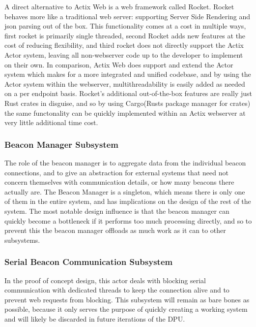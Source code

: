 \bigskip
A direct alternative to Actix Web is a web framework called Rocket.
Rocket behaves more like a traditional web server: supporting \Gls{Server Side Rendering} and json parsing out of the box.
This functionality comes at a cost in multiple ways, first rocket is primarily single threaded, second Rocket adds new features at the cost of reducing flexibility, and third rocket does not directly support the Actix Actor system, leaving all non-webserver code up to the developer to implement on their own.
In comparison, Actix Web does support and extend the Actor system which makes for a more integrated and unified codebase, and by using the Actor system within the webserver, multithreadability is easily added as needed on a per endpoint basis.
Rocket's additional out-of-the-box features are really just Rust crates in disguise, and so by using Cargo(Rusts package manager for crates) the same functonality can be quickly implemented within an Actix webserver at very little additional time cost.

\medskip
\subsubsection{Beacon Manager Subsystem}
The role of the beacon manager is to aggregate data from the individual beacon connections, and to give an abstraction for external systems that need not concern themselves with communication details, or how many beacons there actually are.
The Beacon Manager is a singleton, which means there is only one of them in the entire system, and has implications on the design of the rest of the system.
The most notable design influence is that the beacon manager can quickly become a bottleneck if it performs too much processing directly, and so to prevent this the beacon manager offloads as much work as it can to other subsystems.

\medskip
\subsubsection{Serial Beacon Communication Subsystem}
In the proof of concept design, this actor deals with blocking serial communication with dedicated threads to keep the connection alive and to prevent web requests from blocking.
This subsystem will remain as bare bones as possible, because it only serves the purpose of quickly creating a working system and will likely be discarded in future iterations of the DPU.

\pagebreak

